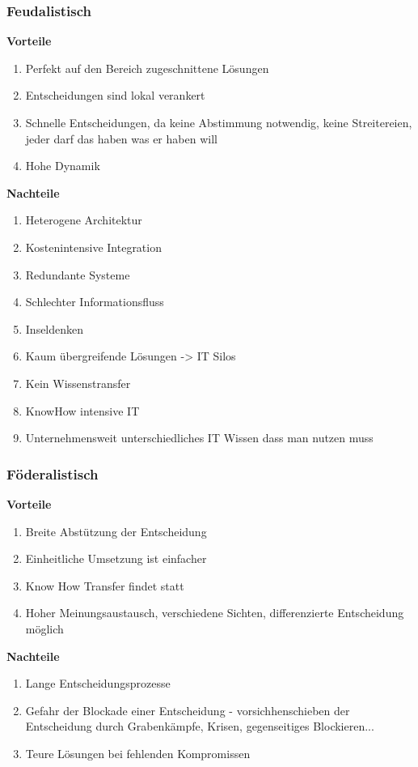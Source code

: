 \subsubsection{Feudalistisch}
\textbf{Vorteile}
\begin{enumerate}
	\item Perfekt auf den Bereich zugeschnittene Lösungen
	\item Entscheidungen sind lokal verankert
	\item Schnelle Entscheidungen, da keine Abstimmung notwendig, keine Streitereien, jeder darf das haben was er haben will
	\item Hohe Dynamik
\end{enumerate}
\textbf{Nachteile}
\begin{enumerate}
	\item Heterogene Architektur
	\item Kostenintensive Integration
	\item Redundante Systeme
	\item Schlechter Informationsfluss
	\item Inseldenken
	\item Kaum übergreifende Lösungen -> IT Silos
	\item Kein Wissenstransfer
	\item KnowHow intensive IT
	\item Unternehmensweit unterschiedliches IT Wissen dass man nutzen muss
\end{enumerate}
\subsubsection{Föderalistisch}
\textbf{Vorteile}
\begin{enumerate}
	\item Breite Abstützung der Entscheidung
	\item Einheitliche Umsetzung ist einfacher
	\item Know How Transfer findet statt
	\item Hoher Meinungsaustausch, verschiedene Sichten, differenzierte Entscheidung möglich
\end{enumerate}
\textbf{Nachteile}
\begin{enumerate}
	\item Lange Entscheidungsprozesse
	\item Gefahr der Blockade einer Entscheidung - vorsichhenschieben der Entscheidung durch Grabenkämpfe, Krisen, gegenseitiges Blockieren...
	\item Teure Lösungen bei fehlenden Kompromissen
\end{enumerate}
